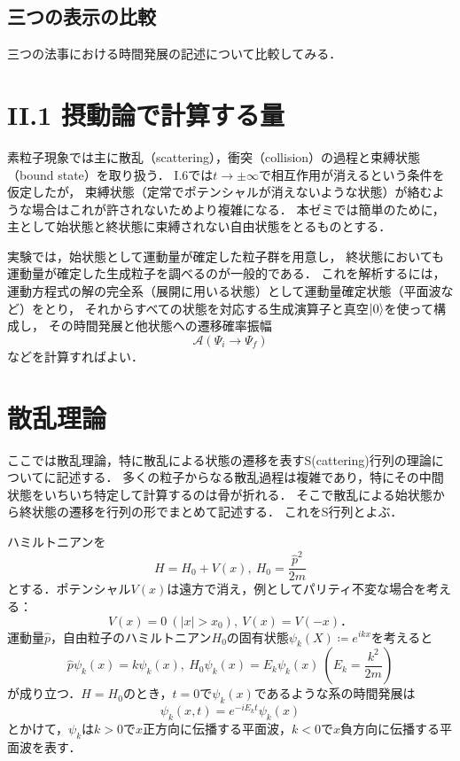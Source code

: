 \documentclass[uplatex]{jsarticle}
\numberwithin{theorem}{section}
\begin{document}
\subsection*{三つの表示の比較}
三つの法事における時間発展の記述について比較してみる．

\section*{II.1 摂動論で計算する量}
素粒子現象では主に散乱（scattering），衝突（collision）の過程と束縛状態（bound state）を取り扱う．
I.6では$t \to \pm \infty$で相互作用が消えるという条件を仮定したが，
束縛状態（定常でポテンシャルが消えないような状態）が絡むような場合はこれが許されないためより複雑になる．
本ゼミでは簡単のために，主として始状態と終状態に束縛されない自由状態をとるものとする．

実験では，始状態として運動量が確定した粒子群を用意し，
終状態においても運動量が確定した生成粒子を調べるのが一般的である．
これを解析するには，運動方程式の解の完全系（展開に用いる状態）として運動量確定状態（平面波など）をとり，
それからすべての状態を対応する生成演算子と真空$\ket{0}$を使って構成し，
その時間発展と他状態への遷移確率振幅
\begin{equation}
    \mathcal{A}(\Psi_i \to \Psi_f)
\end{equation}
などを計算すればよい．

\section*{散乱理論}
ここでは散乱理論，特に散乱による状態の遷移を表すS(cattering)行列の理論についてに記述する．
多くの粒子からなる散乱過程は複雑であり，特にその中間状態をいちいち特定して計算するのは骨が折れる．
そこで散乱による始状態から終状態の遷移を行列の形でまとめて記述する．
これをS行列とよぶ．

ハミルトニアンを
\begin{equation}
    H = H_0 + V(x),\ H_0 = \frac{\hat{p}^2}{2m}
\end{equation}
とする．ポテンシャル$V(x)$は遠方で消え，例としてパリティ不変な場合を考える：
\begin{equation}
    V(x) = 0\ (|x| > x_0),\ V(x) = V(-x)．
\end{equation}
運動量$\hat{p}$，自由粒子のハミルトニアン$H_0$の固有状態$\psi_k(X) \coloneq e^{ikx}$を考えると
\begin{equation}
    \hat{p} \psi_k (x) = k \psi_k (x),\ H_0 \psi_k (x) = E_k \psi_k (x)\ \left( E_k = \frac{k^2}{2m} \right)
\end{equation}
が成り立つ．$H = H_0$のとき，$t=0$で$\psi_k (x)$であるような系の時間発展は
\begin{equation}
    \psi_k (x, t) = e^{-iE_k t} \psi_k (x)
\end{equation}
とかけて，$\psi_k$は$k>0$で$x$正方向に伝播する平面波，$k<0$で$x$負方向に伝播する平面波を表す．
\end{document}
